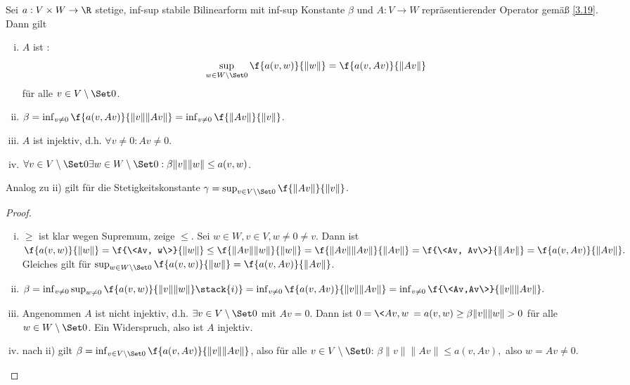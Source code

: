 \begin{st} \label{3.32}
	Sei $a: V \times W \to \R$ stetige, inf-sup stabile Bilinearform mit inf-sup Konstante $\beta$ und $A: V \to W$ repräsentierender Operator gemäß \ref{3.19}.
	Dann gilt
	\begin{enumerate}[i)]
		\item
			$A$ ist :
			\[
				\sup_{w \in W\setminus \Set 0} \f{a(v,w)}{\|w\|}
				= \f{a(v,Av)}{\|Av\|}
			\]
			für alle $v \in V \setminus \Set 0$.
		\item
			$\beta = \inf_{v \neq 0} \f {a(v,Av)}{\|v\| \|Av\|} = \inf_{v \neq 0} \f{\|Av\|}{\|v\|}$.
		\item
			$A$ ist injektiv, d.h. $\forall v \neq 0 : Av \neq 0$.
		\item
			$\forall v \in V \setminus \Set 0 \exists w \in W \setminus \Set 0 : \beta \|v\|\|w\| \le a(v,w)$.
	\end{enumerate}
	\begin{note}
		Analog zu ii) gilt für die Stetigkeitskonstante $\gamma = \sup_{v \in V \setminus \Set 0} \f{\|Av\|}{\|v\|}$.
	\end{note}
	\begin{proof}
		\begin{enumerate}[i)]
			\item
				$\ge$ ist klar wegen Supremum, zeige $\le$.
				Sei $w \in W, v \in V, w \neq 0 \neq v$.
				Dann ist
				\begin{math}
					\f {a(v,w)}{\|w\|}
					= \f{\<Av, w\>}{\|w\|}
					\le \f{\|Av\|\|w\|}{\|w\|}
					= \f{\|Av\|\|Av\|}{\|Av\|}
					= \f{\<Av, Av\>}{\|Av\|}
					= \f{a(v,Av)}{\|Av\|}.
				\end{math}
				Gleiches gilt für $\sup_{w\in W\setminus \Set 0} \f{a(v,w)}{\|w\|} = \f {a(v,Av)}{\|Av\|}$.
			\item
				\begin{math}
					\beta
					= \inf_{v\neq 0} \sup_{w\neq 0} \f{a(v,w)}{\|v\|\|w\|}
					\stack{i)}= \inf_{v\neq 0} \f{a(v,Av)}{\|v\|\|Av\|}
					= \inf_{v\neq 0} \f{\<Av,Av\>}{\|v\|\|Av\|}.
				\end{math}
			\item
				Angenommen $A$ ist nicht injektiv, d.h. $\exists v \in V \setminus \Set 0$ mit $Av = 0$.
				Dann ist
				\begin{math}
					0
					= \<Av, w\>
					= a(v,w)
					\ge \beta \|v\|\|w\|
					> 0
				\end{math}
				für alle $w \in W \setminus \Set 0$.
				Ein Widerspruch, also ist $A$ injektiv.
			\item
				nach ii) gilt $\beta = \inf_{v\in V \setminus \Set 0} \f{a(v,Av)}{\|v\|\|Av\|}$, also für alle $v \in V \setminus \Set 0$:
				\begin{math}
					\beta \|v\|\|Av\| \le a(v,Av),
				\end{math}
				also $w = Av \neq 0$.
		\end{enumerate}
	\end{proof}
\end{st}

